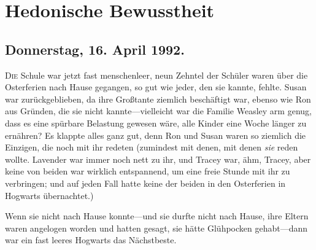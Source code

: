 \chapter{Hedonische Bewusstheit}

\section{Donnerstag, 16. April 1992.}

\lettrine{D}{ie} Schule war jetzt fast menschenleer, neun Zehntel der Schüler waren über die Osterferien nach Hause gegangen, so gut wie jeder, den sie kannte, fehlte. Susan war zurückgeblieben, da ihre Großtante ziemlich beschäftigt war, ebenso wie Ron aus Gründen, die sie nicht kannte—vielleicht war die Familie Weasley arm genug, dass es eine spürbare Belastung gewesen wäre, alle Kinder eine Woche länger zu ernähren?
Es klappte alles ganz gut, denn Ron und Susan waren so ziemlich die Einzigen, die noch mit ihr redeten (zumindest mit denen, mit denen \emph{sie} reden wollte. Lavender war immer noch nett zu ihr, und Tracey war, ähm, Tracey, aber keine von beiden war wirklich entspannend, um eine freie Stunde mit ihr zu verbringen; und auf jeden Fall hatte keine der beiden in den Osterferien in Hogwarts übernachtet.)

Wenn sie nicht nach Hause konnte—und sie durfte nicht nach Hause, ihre Eltern waren angelogen worden und hatten gesagt, sie hätte Glühpocken gehabt—dann war ein fast leeres Hogwarts das Nächstbeste.

